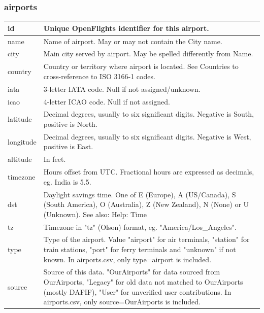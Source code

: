 \documentclass[12pt]{article}
\begin{document}
\subsubsection{airports}
\label{sec:orgfc93489}
\begin{center}
\begin{tabular}{p{2cm}|p{11cm}}
  id & Unique OpenFlights identifier for this airport.\\[0pt]
  \hline
name & Name of airport. May or may not contain the City name.\\[0pt]
  \hline
city & Main city served by airport. May be spelled differently from Name.\\[0pt]
  \hline
country & Country or territory where airport is located. See Countries to cross-reference to ISO 3166-1 codes.\\[0pt]
  \hline
iata & 3-letter IATA code. Null if not assigned/unknown.\\[0pt]
  \hline
icao & 4-letter ICAO code. Null if not assigned.\\[0pt]
  \hline
latitude & Decimal degrees, usually to six significant digits. Negative is South, positive is North.\\[0pt]
  \hline
longitude & Decimal degrees, usually to six significant digits. Negative is West, positive is East.\\[0pt]
  \hline
altitude & In feet.\\[0pt]
  \hline
timezone & Hours offset from UTC. Fractional hours are expressed as decimals, eg. India is 5.5.\\[0pt]
  \hline
dst & Daylight savings time. One of E (Europe), A (US/Canada), S (South America), O (Australia), Z (New Zealand), N (None) or U (Unknown). See also: Help: Time\\[0pt]
  \hline
tz & Timezone in "tz" (Olson) format, eg. "America/Los\_Angeles".\\[0pt]
  \hline
type & Type of the airport. Value "airport" for air terminals, "station" for train stations, "port" for ferry terminals and "unknown" if not known. In airports.csv, only type=airport is included.\\[0pt]
  \hline
source & Source of this data. "OurAirports" for data sourced from OurAirports, "Legacy" for old data not matched to OurAirports (mostly DAFIF), "User" for unverified user contributions. In airports.csv, only source=OurAirports is included.\\[0pt]
\end{tabular}
\end{center}
\end{document}
